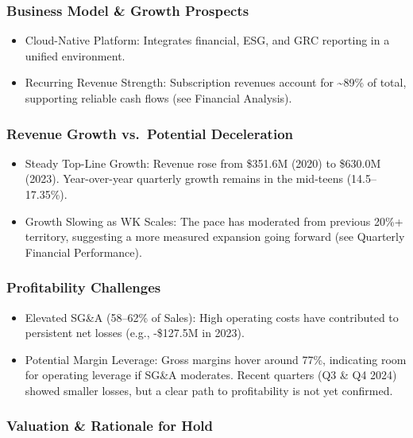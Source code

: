 \documentclass[
  10pt,
  a4paper,
]{article}
\providecommand{\tightlist}{%
  \setlength{\itemsep}{0pt}\setlength{\parskip}{0pt}}\usepackage{longtable,booktabs,array}
\begin{document}
\subsubsection{Business Model \& Growth
Prospects}\label{business-model-growth-prospects}

\begin{itemize}
\tightlist
\item
  Cloud-Native Platform: Integrates financial, ESG, and GRC reporting in
  a unified environment.
\item
  Recurring Revenue Strength: Subscription revenues account for
  \textasciitilde89\% of total, supporting reliable cash flows (see
  Financial Analysis).
\end{itemize}

\subsubsection{Revenue Growth vs.~Potential
Deceleration}\label{revenue-growth-vs.-potential-deceleration}

\begin{itemize}
\tightlist
\item
  Steady Top-Line Growth: Revenue rose from \$351.6M (2020) to \$630.0M
  (2023). Year-over-year quarterly growth remains in the mid-teens
  (14.5--17.35\%).
\item
  Growth Slowing as WK Scales: The pace has moderated from previous
  20\%+ territory, suggesting a more measured expansion going forward
  (see Quarterly Financial Performance).
\end{itemize}

\subsubsection{Profitability Challenges}\label{profitability-challenges}

\begin{itemize}
\tightlist
\item
  Elevated SG\&A (58--62\% of Sales): High operating costs have
  contributed to persistent net losses (e.g., -\$127.5M in 2023).
\item
  Potential Margin Leverage: Gross margins hover around 77\%, indicating
  room for operating leverage if SG\&A moderates. Recent quarters (Q3 \&
  Q4 2024) showed smaller losses, but a clear path to profitability is
  not yet confirmed.
\end{itemize}

\subsubsection{Valuation \& Rationale for
Hold}\label{valuation-rationale-for-hold}
\end{document}
